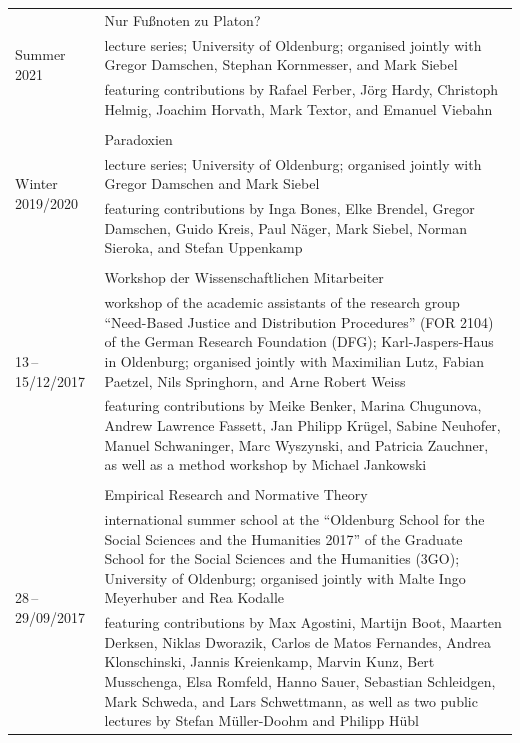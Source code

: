 \documentclass[a4paper,10pt]{article}
\begin{document}
\begin{longtable}{p{2.5cm}p{11cm}}
\\
\multirow{3}{2.5cm}{\footnotesize{Summer 2021}} & Nur Fußnoten zu Platon?\\
& \footnotesize{lecture series; University of Oldenburg; organised jointly with Gregor Damschen, Stephan Kornmesser, and Mark Siebel}\\
& \footnotesize{featuring contributions by Rafael Ferber, Jörg Hardy, Christoph Helmig, Joachim Horvath, Mark Textor, and Emanuel Viebahn}\\
\\
\multirow{3}{2.5cm}{\footnotesize{Winter 2019/2020}} & Paradoxien\\
& \footnotesize{lecture series; University of Oldenburg; organised jointly with Gregor Damschen and Mark Siebel}\\
& \footnotesize{featuring contributions by Inga Bones, Elke Brendel, Gregor Damschen, Guido Kreis, Paul Näger, Mark Siebel, Norman Sieroka, and Stefan Uppenkamp}\\
\\
\multirow{3}{2.5cm}{\footnotesize{13\,--\,15/12/2017}} & Workshop der Wissenschaftlichen Mitarbeiter\\
& \footnotesize{workshop of the academic assistants of the research group \enquote{Need-Based Justice and Distribution Procedures} (FOR 2104) of the German Research Foundation (DFG); Karl-Jaspers-Haus in Oldenburg; organised jointly with Maximilian Lutz, Fabian Paetzel, Nils Springhorn, and Arne Robert Weiss}\\
& \footnotesize{featuring contributions by Meike Benker, Marina Chugunova, Andrew Lawrence Fassett, Jan Philipp Krügel, Sabine Neuhofer, Manuel Schwaninger, Marc Wyszynski, and Patricia Zauchner, as well as a method workshop by Michael Jankowski}\\
\\
\multirow{3}{2.5cm}{\footnotesize{28\,--\,29/09/2017}} & Empirical Research and Normative Theory\\
& \footnotesize{international summer school at the \enquote{Oldenburg School for the Social Sciences and the Humanities 2017} of the Graduate School for the Social Sciences and the Humanities (3GO); University of Oldenburg; organised jointly with Malte Ingo Meyerhuber and Rea Kodalle}\\
& \footnotesize{featuring contributions by Max Agostini, Martijn Boot, Maarten Derksen, Niklas Dworazik, Carlos de Matos Fernandes, Andrea Klonschinski, Jannis Kreienkamp, Marvin Kunz, Bert Musschenga, Elsa Romfeld, Hanno Sauer, Sebastian Schleidgen, Mark Schweda, and Lars Schwettmann, as well as two public lectures by Stefan Müller-Doohm and Philipp Hübl}\\

\end{longtable}
\end{document}
